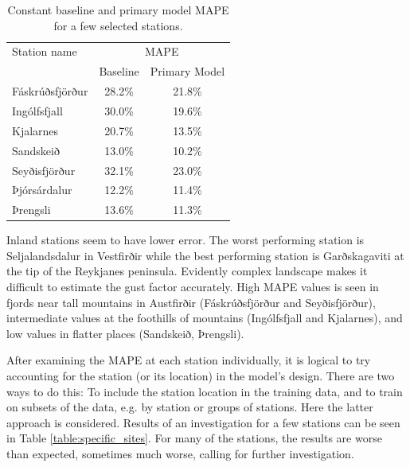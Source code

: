 \begin{table}[H]
    \caption[Primary model MAPE by selected stations]{Constant baseline and primary model MAPE for a few selected stations.}
    \label{table:more_specific_sites}
    \centering
    \begin{tabular}{lcc}
        \toprule
        Station name & \multicolumn{2}{c}{MAPE}\\
         & Baseline & Primary Model\\
        \midrule
        Fáskrúðsfjörður & 28.2\% & 21.8\%\\
        Ingólfsfjall & 30.0\% & 19.6\%\\
        Kjalarnes & 20.7\% & 13.5\% \\
        Sandskeið & 13.0\% & 10.2\%\\
        Seyðisfjörður & 32.1\% & 23.0\%\\
        Þjórsárdalur & 12.2\% & 11.4\%\\
        Þrengsli & 13.6\% & 11.3\%\\
        \bottomrule
    \end{tabular}
\end{table}

Inland stations seem to have lower error. The worst performing station is Seljalandsdalur in Vestfirðir while the best performing station is Garðskagaviti at the tip of the Reykjanes peninsula. Evidently complex landscape makes it difficult to estimate the gust factor accurately. High MAPE values is seen in fjords near tall mountains in Austfirðir (Fáskrúðsfjörður and Seyðisfjörður), intermediate values at the foothills of mountains (Ingólfsfjall and Kjalarnes), and low values in flatter places (Sandskeið, Þrengsli).

After examining the MAPE at each station individually, it is logical to try accounting for the station (or its location) in the model’s design. There are two ways to do this: To include the station location in the training data, and to train on subsets of the data, e.g. by station or groups of stations. Here the latter approach is considered. Results of an investigation for a few stations can be seen in Table \ref{table:specific_sites}. For many of the stations, the results are worse than expected, sometimes much worse, calling for further investigation.

